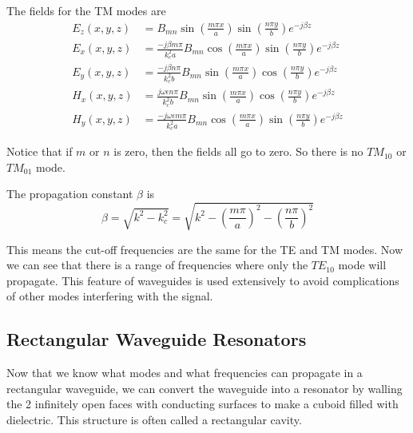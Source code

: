\begin{enumerate}
The fields for the TM modes are
\begin{subequations}
\begin{align}
E_z(x,y,z)& =B_{mn}\sin\left(\frac{m\pi x}{a}\right)\sin\left(\frac{n\pi y}{b}\right)e^{-j\beta z}\\
E_x(x,y,z)& =\frac{-j\beta m\pi}{k_c^2a}B_{mn}\cos\left(\frac{m\pi x}{a}\right)\sin\left(\frac{n\pi y}{b}\right)e^{-j\beta z}\\
E_y(x,y,z)& =\frac{-j\beta n\pi}{k_c^2b}B_{mn}\sin\left(\frac{m\pi x}{a}\right)\cos\left(\frac{n\pi y}{b}\right)e^{-j\beta z}\\
H_x(x,y,z)& =\frac{j\omega\epsilon n\pi}{k_c^2b}B_{mn}\sin\left(\frac{m\pi x}{a}\right)\cos\left(\frac{n\pi y}{b}\right)e^{-j\beta z}\\
H_y(x,y,z)& =\frac{-j\omega
\epsilon m\pi}{k_c^2a}B_{mn}\cos\left(\frac{m\pi x}{a}\right)\sin\left(\frac{n\pi y}{b}\right)e^{-j\beta z}
\end{align}
\end{subequations}

Notice that if $m$ or $n$ is zero, then the fields all go to zero. So there is no $TM_{10}$ or $TM_{01}$ mode.

The propagation constant $\beta$ is
\begin{equation}
\beta = \sqrt{k^2-k_c^2}=\sqrt{k^2-\left(\frac{m\pi}{a}\right)^2-\left(\frac{n\pi}{b}\right)^2}
\end{equation}

This means the cut-off frequencies are the same for the TE and TM modes. Now we can see that there is a range of frequencies where only the $TE_{10}$ mode will propagate. This feature of waveguides is used extensively to avoid complications of other modes interfering with the signal.
\end{enumerate}



\subsection{Rectangular Waveguide Resonators}

Now that we know what modes and what frequencies can propagate in a rectangular waveguide, we can convert the waveguide into a resonator by walling the 2 infinitely open faces with conducting surfaces to make a cuboid filled with dielectric. This structure is often called a rectangular cavity.\\

